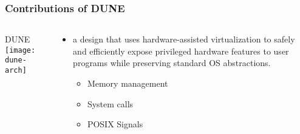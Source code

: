 \begin{frame}[plain]
	\frametitle{Contributions of DUNE}
	
	
	
	\begin{columns}
		
		\begin{column}{.4\textwidth}
			\centering
			DUNE
			\texttt{[image: dune-arch]}
			
		\end{column}
		
		\begin{column}{.6\textwidth}

		\begin{itemize}
			\item a design that uses hardware-assisted virtualization to safely and efficiently expose privileged hardware features to user programs while preserving standard OS abstractions.
			\Large
			\begin{itemize}
				\item Memory	 management	
				\item System	 calls
 				\item POSIX	 Signals	
			\end{itemize}
			
		\end{itemize}						
			
		\end{column}
		
		
	\end{columns}
	
	
\end{frame}


